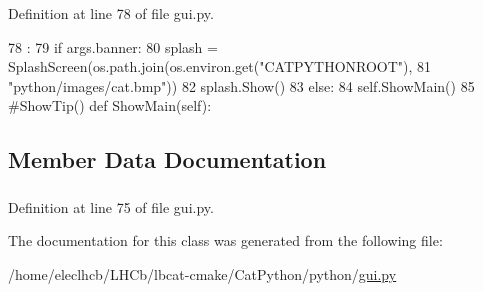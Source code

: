 Definition at line 78 of file gui.py.


\begin{DoxyCode}
78                    :
79         if args.banner:
80             splash = SplashScreen(os.path.join(os.environ.get("CATPYTHONROOT"),
81                                                "python/images/cat.bmp"))
82             splash.Show()
83         else:
84             self.ShowMain()
85             #ShowTip()
    def ShowMain(self):
\end{DoxyCode}


\subsection{Member Data Documentation}
\hypertarget{classgui_1_1Gui_a9a969f7b54f7e42900732a01995771ab}{
\subsubsection[{appFrame}]{}}
\label{classgui_1_1Gui_a9a969f7b54f7e42900732a01995771ab}


Definition at line 75 of file gui.py.

The documentation for this class was generated from the following file:\begin{DoxyCompactItemize}
\item 
/home/eleclhcb/LHCb/lbcat-\/cmake/CatPython/python/\hyperlink{gui_8py}{gui.py}\end{DoxyCompactItemize}
